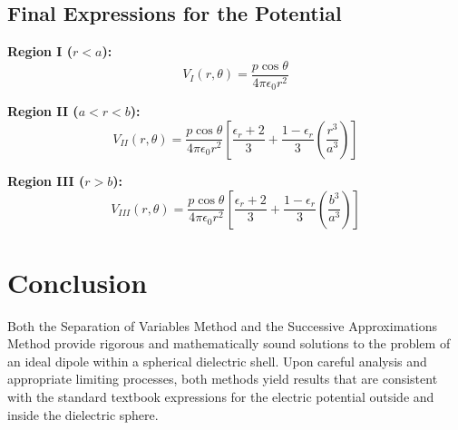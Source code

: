 \documentclass[12pt]{article}
\begin{document}
\subsection*{Final Expressions for the Potential}

\textbf{Region I (\(r < a\)):}
\[
V_I(r,\theta) = \frac{p\cos\theta}{4\pi\epsilon_0r^2}
\]

\textbf{Region II (\(a < r < b\)):}
\[
V_{II}(r,\theta) = \frac{p\cos\theta}{4\pi\epsilon_0r^2}\left[\frac{\epsilon_r + 2}{3} + \frac{1-\epsilon_r}{3}\left(\frac{r^3}{a^3}\right)\right]
\]

\textbf{Region III (\(r > b\)):}
\[
V_{III}(r,\theta) = \frac{p\cos\theta}{4\pi\epsilon_0r^2}\left[\frac{\epsilon_r + 2}{3} + \frac{1-\epsilon_r}{3}\left(\frac{b^3}{a^3}\right)\right]
\]

\section*{Conclusion}

Both the Separation of Variables Method and the Successive Approximations Method provide rigorous and mathematically sound solutions to the problem of an ideal dipole within a spherical dielectric shell. Upon careful analysis and appropriate limiting processes, both methods yield results that are consistent with the standard textbook expressions for the electric potential outside and inside the dielectric sphere.
\end{document}

